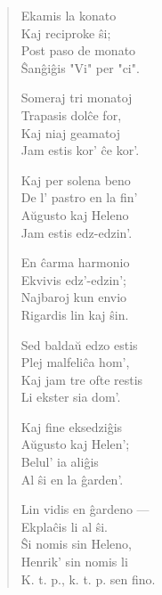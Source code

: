 \begin{verse}
                        Ekamis la konato\\
                        Kaj reciproke \^si;\\
                        Post paso de monato\\
                        \^San\^gi\^gis "Vi" per "ci".

                        Someraj tri monatoj\\
                        Trapasis dol\^ce for,\\
                        Kaj niaj geamatoj\\
                        Jam estis kor' \^ce kor'.

                        Kaj per solena beno\\
                        De l' pastro en la fin'\\
                        A\u ugusto kaj Heleno\\
                        Jam estis edz-edzin'.

                        En \^carma harmonio\\
                        Ekvivis edz'-edzin';\\
                        Najbaroj kun envio\\
                        Rigardis lin kaj \^sin.

                        Sed balda\u u edzo estis\\
                        Plej malfeli\^ca hom',\\
                        Kaj jam tre ofte restis\\
                        Li ekster sia dom'.

                        Kaj fine eksedzi\^gis\\
                        A\u ugusto kaj Helen';\\
                        Belul' ia ali\^gis\\
                        Al \^si en la \^garden'.

                        Lin vidis en \^gardeno ---\\
                        Ekpla\^cis li al \^si.\\
                        \^Si nomis sin Heleno,\\
                        Henrik' sin nomis li\\
                        K. t. p., k. t. p. sen fino.

\end{verse}

\smallrule{}
